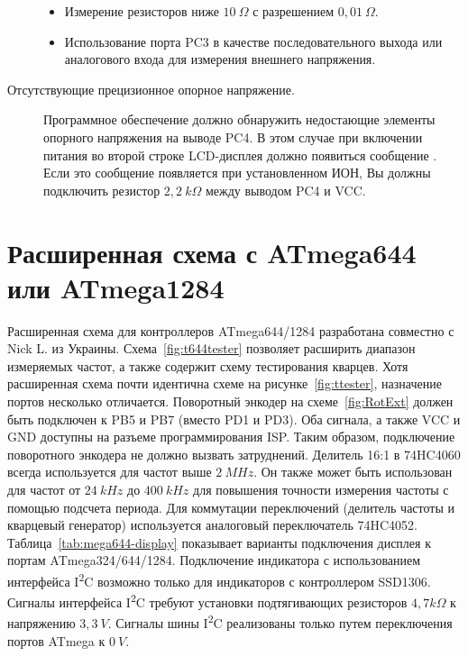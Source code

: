 \begin{description}
\begin{itemize}
 \item Измерение резисторов ниже \(10~\Omega\) с разрешением \(0,01~\Omega\).\\
 \item Использование порта PC3 в качестве последовательного выхода или аналогового входа для измерения внешнего напряжения.\\
\end{itemize}
\item[Отсутствующие прецизионное опорное напряжение.]
Программное обеспечение должно обнаружить недостающие элементы опорного напряжения на выводе PC4. В этом случае при 
		включении питания во второй строке LCD-дисплея должно появиться сообщение . Если это сообщение 
появляется при установленном ИОН, Вы должны подключить резистор \(2,2~k\Omega\) между выводом PC4 и VCC.

\end{description}

\section{Расширенная схема с ATmega644 или ATmega1284}

Расширенная схема для контроллеров ATmega644/1284 разработана совместно с Nick L. из Украины.
Схема~\ref{fig:t644tester} позволяет расширить диапазон измеряемых частот, а также содержит схему 
тестирования кварцев. 
Хотя расширенная схема почти идентична схеме на рисунке~\ref{fig:ttester}, 
назначение портов несколько отличается.
Поворотный энкодер на схеме~\ref{fig:RotExt} должен быть подключен к PB5 и PB7 (вместо PD1 и PD3).
Оба сигнала, а также VCC и GND доступны на разъеме программирования ISP. Таким образом, подключение
поворотного энкодера не должно вызвать затруднений.
Делитель 16:1 в 74HC4060 всегда используется для частот выше \(2~MHz\). 
Он также может быть использован для частот от \(24~kHz\) до \(400~kHz\) для повышения точности
измерения частоты с помощью подсчета периода.
Для коммутации переключений (делитель частоты и кварцевый генератор) используется 
аналоговый переключатель 74HC4052.
Таблица~\ref{tab:mega644-display} показывает варианты подключения дисплея к портам 
ATmega324/644/1284.
Подключение индикатора с использованием интерфейса I\textsuperscript{2}C возможно только для индикаторов с 
контроллером SSD1306.
Сигналы интерфейса I\textsuperscript{2}C требуют установки подтягивающих резисторов \(4,7k\Omega\) к напряжению \(3,3~V\).
Сигналы шины I\textsuperscript{2}C реализованы только путем переключения портов ATmega к \(0~V\).

